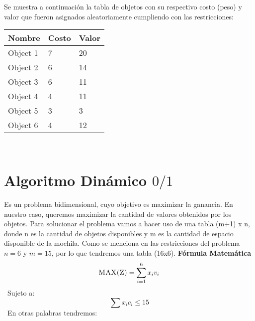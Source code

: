 \documentclass[10pt,letterpaper]{article}
\begin{document}
Se muestra a continuación la tabla de objetos con su respectivo costo (peso) y valor 
        que fueron asignados aleatoriamente cumpliendo con las restricciones: 
\begin{center}
\begin{tabu} to 0.6\textwidth { | X[l] | X[l] | X[l] | } 
\hline
{}
\textbf{Nombre} & \textbf{Costo} & \textbf{Valor}\\
\hline
Object 1 & 7 & 20 \\
\hline
Object 2 & 6 & 14 \\
\hline
Object 3 & 6 & 11 \\
\hline
Object 4 & 4 & 11 \\
\hline
Object 5 & 3 & 3 \\
\hline
Object 6 & 4 & 12 \\
\hline
\end{tabu} \\
\end{center}
\section{Algoritmo Dinámico $0/1$} 
        Es un problema bidimensional, cuyo objetivo es maximizar la ganancia. 
        En nuestro caso, queremos maximizar la cantidad de valores obtenidos por los objetos. 
        Para solucionar el problema vamos a hacer uso de una tabla (m+1) x n, donde n es la cantidad 
        de objetos disponibles y m es la cantidad de espacio disponible de la mochila. 
        Como se menciona en las restricciones del problema $n = 6$ y $m = 15$, por lo que tendremos 
        una tabla (16x6). \newline \newline \newline 
        \textbf{\Large Fórmula Matemática} 
        \[ \textsc{\normalsize MAX(Z)}\\[0.5cm] = \sum_{i=1}^{6}x_{i}v_{i} \] 
        \ Sujeto a:  
        \[ \sum x_{i}c_{i} \leq 15 \] 
        \ En otras palabras tendremos:  
        
\end{document}
